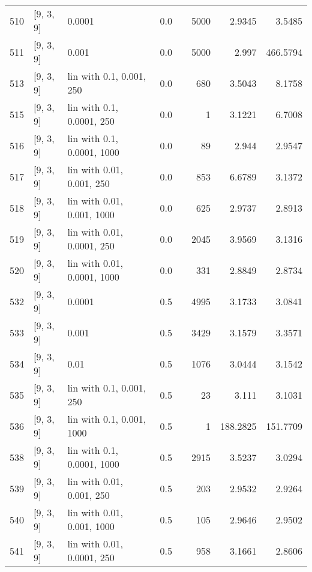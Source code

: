 \begin{longtable}{lllrrrrr}
  510 &          [9, 3, 9] &                      0.0001 &      0.0 &     & 5000 &   2.9345 &   3.5485 \\
  511 &          [9, 3, 9] &                       0.001 &      0.0 &     & 5000 &    2.997 & 466.5794 \\
  513 &          [9, 3, 9] &    lin with 0.1, 0.001, 250 &      0.0 &     &  680 &   3.5043 &   8.1758 \\
  515 &          [9, 3, 9] &   lin with 0.1, 0.0001, 250 &      0.0 &     &    1 &   3.1221 &   6.7008 \\
  516 &          [9, 3, 9] &  lin with 0.1, 0.0001, 1000 &      0.0 &     &   89 &    2.944 &   2.9547 \\
  517 &          [9, 3, 9] &   lin with 0.01, 0.001, 250 &      0.0 &     &  853 &   6.6789 &   3.1372 \\
  518 &          [9, 3, 9] &  lin with 0.01, 0.001, 1000 &      0.0 &     &  625 &   2.9737 &   2.8913 \\
  519 &          [9, 3, 9] &  lin with 0.01, 0.0001, 250 &      0.0 &     & 2045 &   3.9569 &   3.1316 \\
  520 &          [9, 3, 9] & lin with 0.01, 0.0001, 1000 &      0.0 &     &  331 &   2.8849 &   2.8734 \\
  532 &          [9, 3, 9] &                      0.0001 &      0.5 &     & 4995 &   3.1733 &   3.0841 \\
  533 &          [9, 3, 9] &                       0.001 &      0.5 &     & 3429 &   3.1579 &   3.3571 \\
  534 &          [9, 3, 9] &                        0.01 &      0.5 &     & 1076 &   3.0444 &   3.1542 \\
  535 &          [9, 3, 9] &    lin with 0.1, 0.001, 250 &      0.5 &     &   23 &    3.111 &   3.1031 \\
  536 &          [9, 3, 9] &   lin with 0.1, 0.001, 1000 &      0.5 &     &    1 & 188.2825 & 151.7709 \\
  538 &          [9, 3, 9] &  lin with 0.1, 0.0001, 1000 &      0.5 &     & 2915 &   3.5237 &   3.0294 \\
  539 &          [9, 3, 9] &   lin with 0.01, 0.001, 250 &      0.5 &     &  203 &   2.9532 &   2.9264 \\
  540 &          [9, 3, 9] &  lin with 0.01, 0.001, 1000 &      0.5 &     &  105 &   2.9646 &   2.9502 \\
  541 &          [9, 3, 9] &  lin with 0.01, 0.0001, 250 &      0.5 &     &  958 &   3.1661 &   2.8606 \\

\end{longtable}
